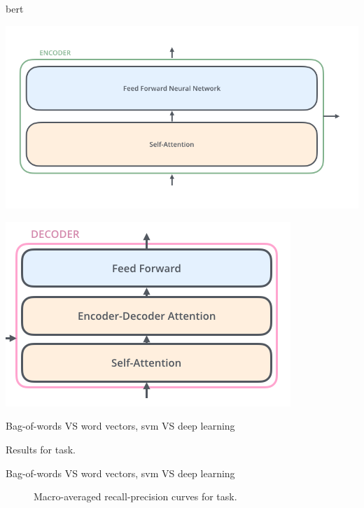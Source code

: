 \begin{frame}{\acf{bert}}
\begin{center}
     \begin{minipage}{.4\textwidth}
      \includegraphics[width=\textwidth]{img/transformer2.png}
     \end{minipage}
     \begin{minipage}{.4\textwidth}
      \includegraphics[width=\textwidth]{img/transformer3.png}
     \end{minipage}
    \end{center}
  \end{frame}

\begin{frame}{Bag-of-words VS word vectors, \acs{svm} VS deep learning}
\begin{table}
  \centering
  \caption{Results for \fullSite{} task.}
  \footnotesize
  
\end{table}
\end{frame}

\begin{frame}{Bag-of-words VS word vectors, \acs{svm} VS deep learning}
\begin{figure}
  \centering
  \resizebox{0.9\textwidth}{!}{}
  \caption{Macro-averaged recall-precision curves for \fullSite{} task.}
\end{figure}

\end{frame}

